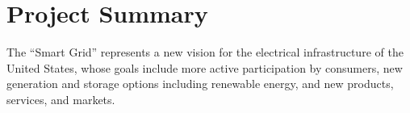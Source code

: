 
\section*{Project Summary}







The ``Smart Grid'' represents a new vision for
the electrical infrastructure of the United States, whose goals include
more active participation by consumers, new generation and storage options
including renewable energy, and new products, services, and markets. 

